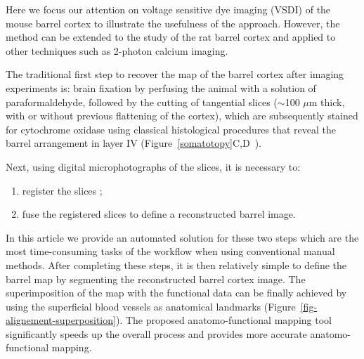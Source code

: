 Here we focus our attention on voltage sensitive dye imaging (VSDI) of the mouse barrel cortex to illustrate the usefulness of the approach. However, the method can be extended to the study of the rat barrel cortex and applied to other techniques such as 2-photon calcium imaging.  %


The traditional first step to recover the map of the barrel cortex after imaging experiments is: brain fixation by perfusing the animal with a solution of paraformaldehyde, followed by the cutting of tangential slices ($\sim$100 $\mu$m thick, with or without previous flattening of the cortex), which are subsequently stained for cytochrome oxidase using classical histological procedures that reveal the barrel arrangement in layer IV (Figure~\ref{somatotopy}C,D~\cite{Land-Simons}).

Next, using digital microphotographs of the slices, it is necessary to:
\begin{enumerate}
	\item register the slices ;
	\item fuse the registered slices to define a reconstructed barrel image.
\end{enumerate}
In this article we provide an automated solution for these two steps which are the most time-consuming tasks of the workflow when using conventional manual methods. After completing these steps, it is then relatively simple to define the barrel map by segmenting the reconstructed barrel cortex image. The superimposition of the map with the functional data can be finally achieved by using the superficial blood vessels as anatomical landmarks (Figure~\ref{fig-alignement-superposition}). The proposed anatomo-functional mapping tool significantly speeds up the overall process and provides more accurate anatomo-functional
mapping.





